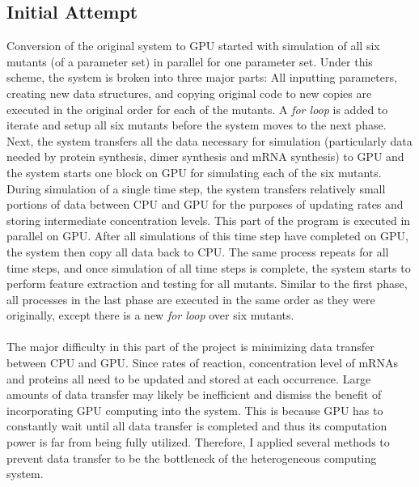 \documentclass[../thesis.tex]{subfiles}
\begin{document}
\subsection{Initial Attempt}
Conversion of the original system to GPU started with simulation of all six mutants (of a parameter set) in parallel for one parameter set. Under this scheme, the system is broken into three major parts: All inputting parameters, creating new data structures, and copying original code to new copies are executed in the original order for each of the mutants. A \textit{for loop} is added to iterate and setup all six mutants before the system moves to the next phase. Next, the system transfers all the data necessary for simulation (particularly data needed by protein synthesis, dimer synthesis and mRNA synthesis) to GPU and the system starts one block on GPU for simulating each of the six mutants. During simulation of a single time step, the system transfers relatively small portions of data between CPU and GPU for the purposes of updating rates and storing intermediate concentration levels. This part of the program is executed in parallel on GPU. After all simulations of this time step have completed on GPU, the system then copy all data back to CPU. The same process repeats for all time steps, and once simulation of all time steps is complete, the system starts to perform feature extraction and testing for all mutants. Similar to the first phase, all processes in the last phase are executed in the same order as they were originally, except there is a new \textit{for loop} over six mutants.\\
\\
 	The major difficulty in this part of the project is minimizing data transfer between CPU and GPU. Since rates of reaction, concentration level of mRNAs and proteins all need to be updated and stored at each occurrence. Large amounts of data transfer may likely be inefficient and dismiss the benefit of incorporating GPU computing into the system. This is because GPU has to constantly wait until all data transfer is completed and thus its computation power is far from being fully utilized. Therefore, I applied several methods to prevent data transfer to be the bottleneck of the heterogeneous computing system. 
	
\end{document}
